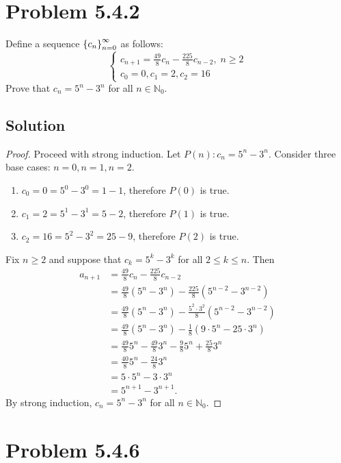 \documentclass[12pt]{extarticle}
\begin{document}
\section*{Problem 5.4.2}

Define a sequence $\qty{c_n}_{n=0}^\infty$ as follows:
\[
	\begin{cases}
		c_{n+1} = \frac{49}{8} c_n - \frac{225}{8} c_{n-2}, \; n \geq 2 \\
		c_0 = 0, c_1 = 2, c_2 = 16
	\end{cases}
\]
Prove that $c_n = 5^n - 3^n$ for all $n \in \mathbb{N}_0$.

\subsection*{Solution}

\begin{proof}
	Proceed with strong induction. Let $P(n): c_n = 5^n - 3^n$. Consider three base cases: $n = 0, n = 1, n = 2$. 
	\begin{enumerate}
		\item $c_0 = 0 = 5^0 - 3^0 = 1 - 1$, therefore $P(0)$ is true.
		\item $c_1 = 2 = 5^1 - 3^1 = 5 - 2$, therefore $P(1)$ is true.
		\item $c_2 = 16 = 5^2 - 3^2 = 25 - 9$, therefore $P(2)$ is true.
	\end{enumerate}
	Fix $n \geq 2$ and suppose that $c_k = 5^k - 3^k$ for all $2 \leq k \leq n$. Then
	\begin{align*}
		a_{n+1} &= \frac{49}{8} c_n - \frac{225}{8} c_{n-2} \\
						&= \frac{49}{8} (5^n - 3^n) - \frac{225}{8} (5^{n-2} - 3^{n-2}) \\
						&= \frac{49}{8} (5^n - 3^n) - \frac{5^2 \cdot 3^2}{8} (5^{n-2} - 3^{n-2}) \\
						&= \frac{49}{8} (5^n - 3^n) - \frac{1}{8} (9\cdot 5^n - 25 \cdot 3^n) \\
						&= \frac{49}{8} 5^n - \frac{49}{8} 3^n - \frac{9}{8} 5^n + \frac{25}{8} 3^n \\
						&= \frac{40}{8} 5^n - \frac{24}{8} 3^n \\
						&= 5 \cdot 5^n - 3\cdot 3^n \\
						&= 5^{n+1} - 3^{n+1}
	.\end{align*}
	By strong induction, $c_n = 5^n - 3^n$ for all $n \in \mathbb{N}_0$.
\end{proof}

\section*{Problem 5.4.6}
\end{document}
